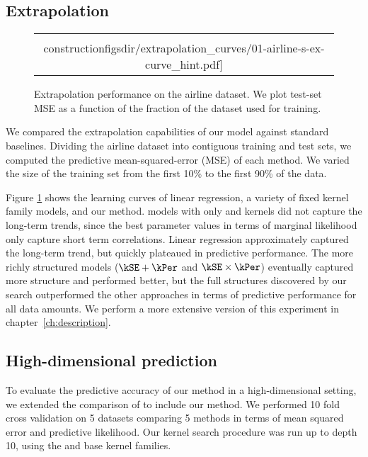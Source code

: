 \subsection{Extrapolation}

\begin{figure}
\centering
\begin{tabular}{c}
\hspace{-0.0cm} \texttt{[image: \\constructionfigsdir/extrapolation\_curves/01-airline-s-ex-curve\_hint.pdf]}
\end{tabular}
\caption[Extrapolation performance on the airline dataset.]{Extrapolation performance on the airline dataset.  We plot test-set MSE as a function of the fraction of the dataset used for training. 
}
\label{fig:extrapolation}
\end{figure}

We compared the extrapolation capabilities of our model against standard baselines\footnotemark.
Dividing the airline dataset into contiguous training and test sets, we computed the predictive mean-squared-error (MSE) of each method.
We varied the size of the training set from the first 10\% to the first 90\% of the data.

Figure \ref{fig:extrapolation} shows the learning curves of linear regression, a variety of fixed kernel family \gp{} models, and our method.  
\gp{} models with only \kSE{} and \kPer{} kernels did not capture the long-term trends, since the best parameter values in terms of \gp{} marginal likelihood only capture short term correlations. 
Linear regression approximately captured the long-term trend, but quickly plateaued in predictive performance.
The more richly structured \gp{} models (${\kSE + \kPer}$ and ${\kSE \times \kPer}$) eventually captured more structure and performed better, but the full structures discovered by our search outperformed the other approaches in terms of predictive performance for all data amounts.
We perform a more extensive version of this experiment in chapter~\ref{ch:description}.


\subsection{High-dimensional prediction}

To evaluate the predictive accuracy of our method in a high-dimensional setting, we extended the comparison of \cite{Duvenaud2011-wb} to include our method.
We performed 10 fold cross validation on 5 datasets\footnotemark{} comparing 5 methods in terms of mean squared error and predictive likelihood.
Our kernel search procedure was run up to depth 10, using the \SE{} and \RQ{} base kernel families\footnotemark{}.

